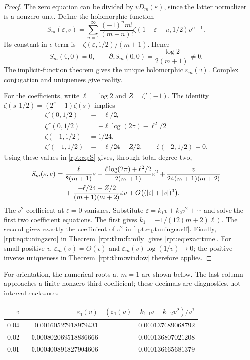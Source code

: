 \documentclass[11pt,a4paper]{article}
\numberwithin{equation}{section}
\theoremstyle{definition}\newtheorem{definition}[theorem]{Definition}
\theoremstyle{remark}\newtheorem{remark}[theorem]{Remark}
\newcommand{\eps}{\varepsilon}
\begin{document}
\begin{proof}
The zero equation can be divided by $vD_m(\eps)$, since the latter normalizer is a nonzero unit. Define the holomorphic function
\begin{equation}
S_m(\eps,v)=\sum_{n=1}^{\infty}
\frac{(-1)^n m!}{(m+n)!}\zeta(1+\eps-n,1/2)v^{n-1}.
\label{rpt:eq:S}
\end{equation}
Its constant-in-$v$ term is $-\zeta(\eps,1/2)/(m+1)$. Hence
\[
S_m(0,0)=0,\qquad
\partial_\eps S_m(0,0)=\frac{\log2}{2(m+1)}\ne0.
\]
The implicit-function theorem gives the unique holomorphic $\eps_m(v)$. Complex conjugation and uniqueness give reality.

For the coefficients, write $\ell=\log2$ and $Z=\zeta'(-1)$. The identity $\zeta(s,1/2)=(2^s-1)\zeta(s)$ implies
\begin{align*}
\zeta'(0,1/2)&=-\ell/2,\\
\zeta''(0,1/2)&=-\ell\log(2\pi)-\ell^2/2,\\
\zeta(-1,1/2)&=1/24,\\
\zeta'(-1,1/2)&=-\ell/24-Z/2,\qquad \zeta(-2,1/2)=0.
\end{align*}
Using these values in \eqref{rpt:eq:S} gives, through total degree two,
\begin{align}
S_m(\eps,v)={}&\frac{\ell}{2(m+1)}\eps
+\frac{\ell\log(2\pi)+\ell^2/2}{2(m+1)}\eps^2
+\frac{v}{24(m+1)(m+2)}
\notag\\
&+\frac{-\ell/24-Z/2}{(m+1)(m+2)}\eps v
+O\bigl((|\eps|+|v|)^3\bigr).
\label{rpt:eq:Sexp}
\end{align}
The $v^2$ coefficient at $\eps=0$ vanishes. Substitute $\eps=k_1v+k_2v^2+\cdots$ and solve the first two coefficient equations. The first gives $k_1=-1/(12(m+2)\ell)$. The second gives exactly the coefficient of $v^2$ in \eqref{rpt:eq:tuningcoeff}. Finally, \eqref{rpt:eq:tuningzero} in Theorem~\ref{rpt:thm:family} gives \eqref{rpt:eq:exacttune}. For small positive $v$, $\eps_m(v)=O(v)$ and $\eps_m(v)\log(1/v)\to0$; the positive inverse uniqueness in Theorem~\ref{rpt:thm:window} therefore applies.
\end{proof}

For orientation, the numerical roots at $m=1$ are shown below. The last column approaches a finite nonzero third coefficient; these decimals are diagnostics, not interval enclosures.
\begin{center}
\begin{tabular}{rrr}
\toprule
$v$ & $\eps_1(v)$ & $(\eps_1(v)-k_{1,1}v-k_{1,2}v^2)/v^3$\\
\midrule
$0.04$ & $-0.00160527918979431$ & $0.000137089068792$\\
$0.02$ & $-0.000802069518886666$ & $0.000136807021208$\\
$0.01$ & $-0.000400891827904606$ & $0.000136665681379$\\
\bottomrule
\end{tabular}
\end{center}
\end{document}
